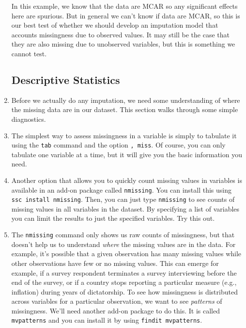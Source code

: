 \documentclass[a4paper,12pt]{article}
\begin{document}
\begin{enumerate}
In this example, we know that the data are MCAR so any significant effects here are spurious. But in general we can't know if data are MCAR, so this is our best test of whether we should develop an imputation model that accounts missingness due to observed values.  It may still be the case that they are also missing due to unobserved variables, but this is something we cannot test.

\subsection*{Descriptive Statistics}

\item Before we actually do any imputation, we need some understanding of where the missing data are in our dataset. This section walks through some simple diagnostics.

\item The simplest way to assess missingness in a variable is simply to tabulate it using the \texttt{tab} command and the option \texttt{, miss}. Of course, you can only tabulate one variable at a time, but it will give you the basic information you need.

\item Another option that allows you to quickly count missing values in variables is available in an add-on package called \texttt{nmissing}. You can install this using \texttt{ssc install nmissing}. Then, you can just type \texttt{nmissing} to see counts of missing values in all variables in the dataset. By specifying a list of variables you can limit the results to just the specified variables. Try this out.

\item The \texttt{nmissing} command only shows us raw counts of missingness, but that doesn't help us to understand {\em where} the missing values are in the data. For example, it's possible that a given observation has many missing values while other observations have few or no missing values. This can emerge for example, if a survey respondent terminates a survey interviewing before the end of the survey, or if a country stops reporting a particular measure (e.g., inflation) during years of dictatorship. To see how missingness is distributed across variables for a particular observation, we want to see {\em patterns} of missingness. We'll need another add-on package to do this. It is called \texttt{mvpatterns} and you can install it by using \texttt{findit mvpatterns}.



\end{enumerate}
\end{document}
